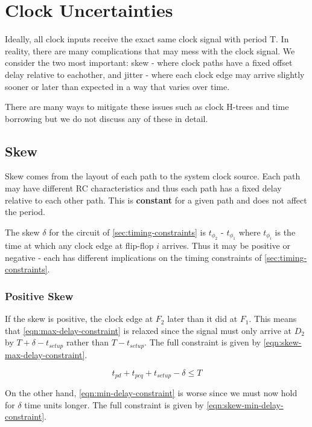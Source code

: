 \documentclass[11pt]{report}
\begin{document}
\section{Clock Uncertainties}
Ideally, all clock inputs receive the exact same clock signal with period T. In reality, there are many complications that may mess with the clock signal. We consider the two most important: skew - where clock paths have a fixed offset delay relative to eachother, and jitter - where each clock edge may arrive slightly sooner or later than expected in a way that varies over time.

There are many ways to mitigate these issues such as clock H-trees and time borrowing but we do not discuss any of these in detail.

\subsection{Skew}
Skew comes from the layout of each path to the system clock source. Each path may have different RC characteristics and thus each path has a fixed delay relative to each other path. This is \textbf{constant} for a given path and does not affect the period.

The skew $\delta$ for the circuit of \autoref{sec:timing-constraints} is $t_{\phi_2}$ - $t_{\phi_1}$ where $t_{\phi_i}$ is the time at which any clock edge at flip-flop $i$ arrives. Thus it may be positive or negative - each has different implications on the timing constraints of \autoref{sec:timing-constraints}.

\subsubsection{Positive Skew}
If the skew is positive, the clock edge at $F_2$ later than it did at $F_1$. This means that \autoref{eqn:max-delay-constraint} is relaxed since the signal must only arrive at $D_2$ by $T + \delta - t_{setup}$ rather than $T - t_{setup}$. The full constraint is given by \autoref{eqn:skew-max-delay-constraint}.

\begin{equation}
	\label{eqn:skew-max-delay-constraint}
	t_{pd} + t_{pcq} + t_{setup} - \delta \le T
\end{equation}

On the other hand, \autoref{eqn:min-delay-constraint} is worse since we must now hold for $\delta$ time units longer. The full constraint is given by \autoref{eqn:skew-min-delay-constraint}.
\end{document}
